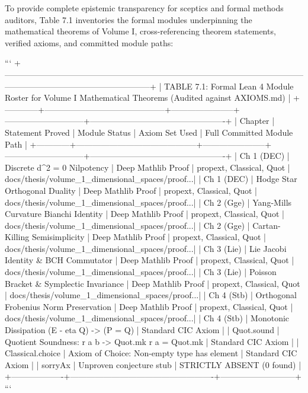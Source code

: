 \documentclass[11pt,twoside,openright]{amsbook}
\begin{document}
{{{{{{To provide complete epistemic transparency for sceptics and formal methods auditors, Table 7.1 inventories the formal modules underpinning the mathematical theorems of Volume I, cross-referencing theorem statements, verified axioms, and committed module paths:

```
+-----------------------------------------------------------------------------------------------------------------------------------------------------------------+
| TABLE 7.1: Formal Lean 4 Module Roster for Volume I Mathematical Theorems (Audited against AXIOMS.md)                                                           |
+------------+--------------------------------------------+-----------------------+-----------------------------+-------------------------------------------------+
| Chapter    | Statement Proved                           | Module Status         | Axiom Set Used              | Full Committed Module Path                      |
+------------+--------------------------------------------+-----------------------+-----------------------------+-------------------------------------------------+
| Ch 1 (DEC) | Discrete d^2 = 0 Nilpotency                | Deep Mathlib Proof    | propext, Classical, Quot    | docs/thesis/volume_1_dimensional_spaces/proof...|
| Ch 1 (DEC) | Hodge Star Orthogonal Duality              | Deep Mathlib Proof    | propext, Classical, Quot    | docs/thesis/volume_1_dimensional_spaces/proof...|
| Ch 2 (Gge) | Yang-Mills Curvature Bianchi Identity      | Deep Mathlib Proof    | propext, Classical, Quot    | docs/thesis/volume_1_dimensional_spaces/proof...|
| Ch 2 (Gge) | Cartan-Killing Semisimplicity              | Deep Mathlib Proof    | propext, Classical, Quot    | docs/thesis/volume_1_dimensional_spaces/proof...|
| Ch 3 (Lie) | Lie Jacobi Identity & BCH Commutator       | Deep Mathlib Proof    | propext, Classical, Quot    | docs/thesis/volume_1_dimensional_spaces/proof...|
| Ch 3 (Lie) | Poisson Bracket & Symplectic Invariance    | Deep Mathlib Proof    | propext, Classical, Quot    | docs/thesis/volume_1_dimensional_spaces/proof...|
| Ch 4 (Stb) | Orthogonal Frobenius Norm Preservation     | Deep Mathlib Proof    | propext, Classical, Quot    | docs/thesis/volume_1_dimensional_spaces/proof...|
| Ch 4 (Stb) | Monotonic Dissipation (E - eta  Q) -> (P = Q) | Standard CIC Axiom        |
| Quot.sound        | Quotient Soundness: r a b -> Quot.mk r a = Quot.mk | Standard CIC Axiom        |
| Classical.choice  | Axiom of Choice: Non-empty type has element        | Standard CIC Axiom        |
| sorryAx           | Unproven conjecture stub                           | STRICTLY ABSENT (0 found)       |
+-------------------+----------------------------------------------------+---------------------------+
```

}}}}}}
\end{document}
